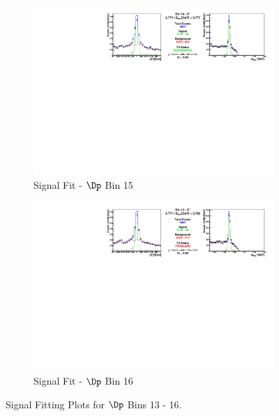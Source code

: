 \begin{figure}[h]
\begin{subfigure}[c]{0.99\textwidth}
\includegraphics[width=\textwidth]{figures/plots/fit_results/Dp_bin_14.pdf}
\caption*{Signal Fit - $\Dp$ Bin 15}
\end{subfigure}

\vspace{5pt}

\begin{subfigure}[c]{0.99\textwidth}
\includegraphics[width=\textwidth]{figures/plots/fit_results/Dp_bin_15.pdf}
\caption*{Signal Fit - $\Dp$ Bin 16}
\end{subfigure}

\caption{Signal Fitting Plots for $\Dp$ Bins 13 - 16.}
\label{fig:Dp_plots_13_16}

\end{figure}


